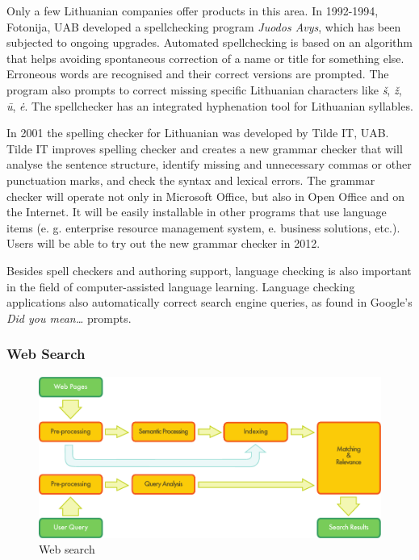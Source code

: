 \documentclass[]{../metanetpaper}
\begin{document}
\begin{multicols}{2}
Only a few Lithuanian companies offer products in this area. In 1992-1994, Fotonija, UAB developed a spellchecking program \textit{Juodos Avys}, which has been subjected to ongoing upgrades. Automated spellchecking is based on an algorithm that helps avoiding spontaneous correction of a name or title for something else. Erroneous words are recognised and their correct versions are prompted. The program also prompts to correct missing specific Lithuanian characters like \textit{š}, \textit{ž},  \textit{ū}, \textit{ė}. The spellchecker has an integrated hyphenation tool for Lithuanian syllables.

In 2001 the spelling checker for Lithuanian was developed by Tilde IT, UAB. Tilde IT improves spelling checker and creates a new grammar checker that will analyse the sentence structure, identify missing and unnecessary commas or other punctuation marks, and check the syntax and lexical errors. The grammar checker will operate not only in Microsoft Office, but also in Open Office and on the Internet. It will be easily installable in other programs that use language items (e. g. enterprise resource management system, e. business solutions, etc.). Users will be able to try out the new grammar checker in 2012.

Besides spell checkers and authoring support, language checking is also important in the field of computer-assisted language learning. Language checking applications also automatically correct search engine queries, as found in Google's \textit{Did you mean…} prompts.

\subsubsection{Web Search}

\begin{figure}[htb]
  \center
  \includegraphics[width=\textwidth]{../_media/english/web_search_architecture}
  \caption{Web search}
  \label{fig:websearcharch_en}
 \end{figure}


\end{multicols}
\end{document}

